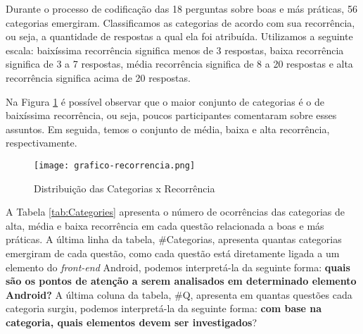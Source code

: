 Durante o processo de codifica\c{c}\~ao das 18 perguntas sobre boas e m\'as pr\'aticas, 56 categorias emergiram. Classificamos as categorias de acordo com sua recorr\^encia, ou seja, a quantidade de respostas a qual ela foi atribu\'ida. Utilizamos a seguinte escala: baix\'issima recorr\^encia significa menos de 3 respostas, baixa recorr\^encia significa de 3 a 7 respostas, m\'edia recorr\^encia significa de 8 a 20 respostas e alta recorr\^encia significa acima de 20 respostas.

Na Figura \ref{fig:CategoriaXRecorrencia} \'e poss\'ivel observar que o maior conjunto de categorias \'e o de baix\'issima recorr\^encia, ou seja, poucos participantes comentaram sobre esses assuntos. Em seguida, temos o conjunto de m\'edia, baixa e alta recorr\^encia, respectivamente.

\begin{figure}[!htb]
	\centering
	\texttt{[image: grafico-recorrencia.png]}
	\caption{Distribui\c{c}\~ao das Categorias x Recorr\^encia}
	\label{fig:CategoriaXRecorrencia}
\end{figure}


A Tabela \ref{tab:Categories} apresenta o n\'umero de ocorr\^encias das categorias de alta, m\'edia e baixa recorr\^encia em cada quest\~ao relacionada a boas e m\'as pr\'aticas. A \'ultima linha da tabela, \#Categorias, apresenta quantas categorias emergiram de cada quest\~ao, como cada quest\~ao est\'a diretamente ligada a um elemento do \textit{front-end} Android, podemos interpret\'a-la da seguinte forma: \textbf{quais s\~ao os pontos de aten\c{c}\~ao a serem analisados em determinado elemento Android?} A \'ultima coluna da tabela, \#Q, apresenta em quantas quest\~oes cada categoria surgiu, podemos interpret\'a-la da seguinte forma: \textbf{com base na categoria, quais elementos devem ser investigados}?



